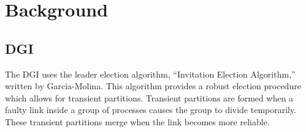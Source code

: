 
\section{Background}

\subsection{DGI}

The DGI uses the leader election algorithm, ``Invitation Election Algorithm,'' written by Garcia-Molina\cite{INVITATIONELECTION}.
This algorithm provides a robust election procedure which allows for transient partitions.
Transient partitions are formed when a faulty link inside a group of processes causes the group to divide temporarily.
These transient partitions merge when the link becomes more reliable.

